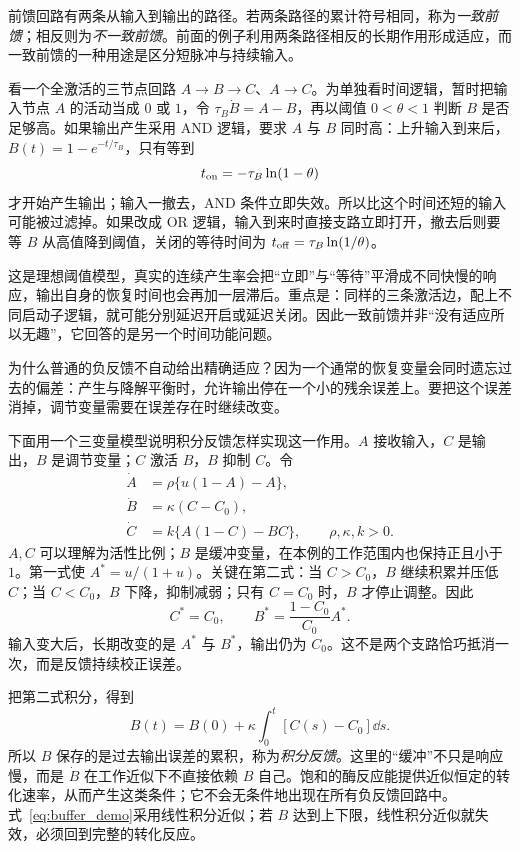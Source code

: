 前馈回路有两条从输入到输出的路径。若两条路径的累计符号相同，称为\emph{一致前馈}；相反则为\emph{不一致前馈}。前面的例子利用两条路径相反的长期作用形成适应，而一致前馈的一种用途是区分短脉冲与持续输入。

看一个全激活的三节点回路 $A\to B\to C$、$A\to C$。为单独看时间逻辑，暂时把输入节点 $A$ 的活动当成 $0$ 或 $1$，令 $\tau_B\dot B=A-B$，再以阈值 $0<\theta<1$ 判断 $B$ 是否足够高。如果输出产生采用 AND 逻辑，要求 $A$ 与 $B$ 同时高：上升输入到来后，$B(t)=1-e^{-t/\tau_B}$，只有等到
\[
t_{\rm on}=-\tau_B\ln(1-\theta)
\]
才开始产生输出；输入一撤去，AND 条件立即失效。所以比这个时间还短的输入可能被过滤掉。如果改成 OR 逻辑，输入到来时直接支路立即打开，撤去后则要等 $B$ 从高值降到阈值，关闭的等待时间为 $t_{\rm off}=\tau_B\ln(1/\theta)$。

这是理想阈值模型，真实的连续产生率会把“立即”与“等待”平滑成不同快慢的响应，输出自身的恢复时间也会再加一层滞后。重点是：同样的三条激活边，配上不同启动子逻辑，就可能分别延迟开启或延迟关闭。因此一致前馈并非“没有适应所以无趣”，它回答的是另一个时间功能问题。


为什么普通的负反馈不自动给出精确适应？因为一个通常的恢复变量会同时遗忘过去的偏差：产生与降解平衡时，允许输出停在一个小的残余误差上。要把这个误差消掉，调节变量需要在误差存在时继续改变。

下面用一个三变量模型说明积分反馈怎样实现这一作用。$A$ 接收输入，$C$ 是输出，$B$ 是调节变量；$C$ 激活 $B$，$B$ 抑制 $C$。令
\begin{align}
\dot A&=\rho\{u(1-A)-A\},\\
\dot B&=\kappa(C-C_0),\\
\dot C&=k\{A(1-C)-BC\},\qquad \rho,\kappa,k>0.\label{eq:buffer_demo}
\end{align}
$A,C$ 可以理解为活性比例；$B$ 是缓冲变量，在本例的工作范围内也保持正且小于 $1$。第一式使 $A^*=u/(1+u)$。关键在第二式：当 $C>C_0$，$B$ 继续积累并压低 $C$；当 $C<C_0$，$B$ 下降，抑制减弱；只有 $C=C_0$ 时，$B$ 才停止调整。因此
\[
C^*=C_0,\qquad B^*=\frac{1-C_0}{C_0}A^*.
\]
输入变大后，长期改变的是 $A^*$ 与 $B^*$，输出仍为 $C_0$。这不是两个支路恰巧抵消一次，而是反馈持续校正误差。

把第二式积分，得到
\[
B(t)=B(0)+\kappa\int_0^t[C(s)-C_0]\dd s.
\]
所以 $B$ 保存的是过去输出误差的累积，称为\emph{积分反馈}。这里的“缓冲”不只是响应慢，而是 $\dot B$ 在工作近似下不直接依赖 $B$ 自己。饱和的酶反应能提供近似恒定的转化速率，从而产生这类条件；它不会无条件地出现在所有负反馈回路中。式~\eqref{eq:buffer_demo}采用线性积分近似；若 $B$ 达到上下限，线性积分近似就失效，必须回到完整的转化反应。

